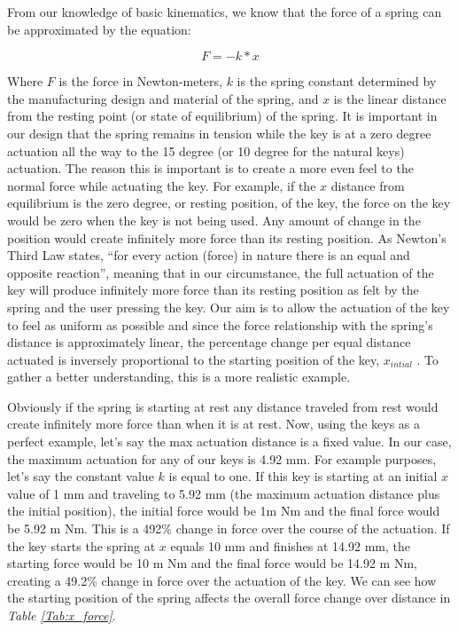 From our knowledge of basic kinematics, we know that the force of a spring can be approximated by the equation:

\begin{equation} \label{spring_force}
  F = -k * x
\end{equation}

Where $ F $ is the force in Newton-meters, $ k $ is the spring constant determined by the manufacturing design and material of the spring, and $ x $ is the linear distance from the resting point (or state of equilibrium) of the spring. It is important in our design that the spring remains in tension while the key is at a zero degree actuation all the way to the 15 degree (or 10 degree for the natural keys) actuation. The reason this is important is to create a more even feel to the normal force while actuating the key. For example, if the $ x $ distance from equilibrium is the zero degree, or resting position, of the key, the force on the key would be zero when the key is not being used. Any amount of change in the position would create infinitely more force than its resting position. As Newton’s Third Law states, “for every action (force) in nature there is an equal and opposite reaction”, meaning that in our circumstance, the full actuation of the key will produce infinitely more force than its resting position as felt by the spring and the user pressing the key. Our aim is to allow the actuation of the key to feel as uniform as possible and since the force relationship with the spring’s distance is approximately linear, the percentage change per equal distance actuated is inversely proportional to the starting position of the key, $ x_{intial} $ . To gather a better understanding, this is a more realistic example.

Obviously if the spring is starting at rest any distance traveled from rest would create infinitely more force than when it is at rest. Now, using the keys as a perfect example, let’s say the max actuation distance is a fixed value. In our case, the maximum actuation for any of our keys is 4.92 mm. For example purposes, let’s say the constant value $ k $ is equal to one. If this key is starting at an initial $ x $ value of 1 mm and traveling to 5.92 mm (the maximum actuation distance plus the initial position), the initial force would be 1m Nm and the final force would be 5.92 m Nm. This is a 492\% change in force over the course of the actuation. If the key starts the spring at $ x $ equals 10 mm and finishes at 14.92 mm, the starting force would be 10 m Nm and the final force would be 14.92 m Nm, creating a 49.2\% change in force over the actuation of the key. We can see how the starting position of the spring affects the overall force change over distance in \textit{Table \ref{Tab:x_force}}.

